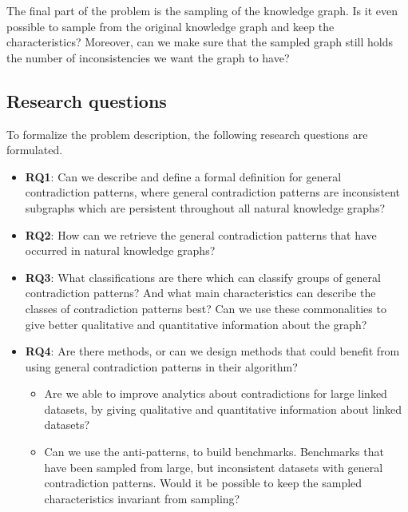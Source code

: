 \documentclass[11pt,letterpaper ,oneside ]{book}
\begin{document}
	The final part of the problem is the sampling of the knowledge graph. Is it even possible to sample from the original knowledge graph and keep the characteristics? Moreover, can we make sure that the sampled graph still holds the number of inconsistencies we want the graph to have? 
	
	\subsection{Research questions}
	To formalize the problem description, the following research questions are formulated.
	\begin{itemize}
		\item \textbf{RQ1}: Can we describe and define a formal definition for general contradiction patterns, where general contradiction patterns are inconsistent subgraphs which are persistent throughout all natural knowledge graphs?
		\item \textbf{RQ2}: How can we retrieve the general contradiction patterns that have occurred in natural knowledge graphs? 
		\item \textbf{RQ3}: What classifications are there which can classify groups of general contradiction patterns? And what main characteristics can describe the classes of contradiction patterns best? Can we use these commonalities to give better qualitative and quantitative information about the graph?
		\item \textbf{RQ4}: Are there methods, or can we design methods that could benefit from using general contradiction patterns in their algorithm? 
		\begin{itemize}
			\item Are we able to improve analytics about contradictions for large linked datasets, by giving qualitative and quantitative information about linked datasets?
			\item Can we use the anti-patterns, to build benchmarks. Benchmarks that have been sampled from large, but inconsistent datasets with general contradiction patterns. Would it be possible to keep the sampled characteristics invariant from sampling?
		\end{itemize}
	\end{itemize}
	
\end{document}
